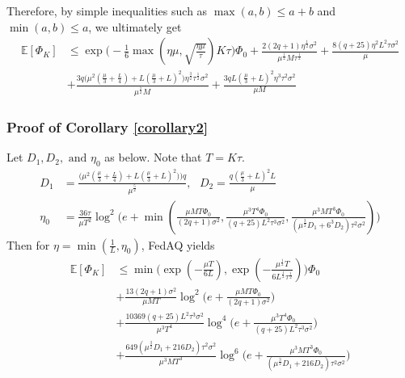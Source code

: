 \documentclass[11pt]{article}
\begin{document}
Therefore, by simple inequalities such as $\max(a, b) \leq a+b$ and $\min(a, b) \leq a$, we ultimately get
\begin{align} \label{ineq_theorem2}
    \mathbb{E}[\Phi_K] &\leq \exp{\Big(-\frac{1}{6}\max(\eta\mu, \sqrt{\frac{\eta\mu}{\tau}})K\tau\Big)} \Phi_0 + \frac{2(2q+1)\eta^{\frac{1}{2}}\sigma^2}{\mu^{\frac{1}{2}}M\tau^{\frac{1}{2}}} + \frac{8(q+25)\eta^2 L^2\tau\sigma^2}{\mu} \nonumber\\
        &+ \frac{3q\Big(\mu^2(\frac{\mu}{3}+\frac{L}{4}) + L(\frac{\mu}{3}+L)^2\Big)\eta^{\frac{3}{2}}\tau^{\frac{1}{2}}\sigma^2}{\mu^{\frac{5}{2}}M} + \frac{3qL(\frac{\mu}{3}+L)^2 \eta^3\tau^2\sigma^2}{\mu M}
\end{align}

\subsubsection{Proof of Corollary \ref{corollary2}}
\label{app:proof_corollary2}

\begin{corollary} \label{corollary2}
    Let $D_1, D_2,\textrm{ and } \eta_0$ as below. Note that $T = K\tau$.
    \begin{align*}
        D_1 &= \frac{\Big( \mu^2(\frac{\mu}{3}+\frac{L}{4}) + L(\frac{\mu}{3}+L)^2) \Big)q}{\mu^{\frac{5}{2}}}, \textrm{ } D_2 = \frac{q(\frac{\mu}{3}+L)^2 L}{\mu} \\
        \eta_0 &= \frac{36\tau}{\mu T^2}\log^2\Big(e+\min(\frac{\mu M T \Phi_0}{(2q+1)\sigma^2}, \frac{\mu^3 T^4\Phi_0}{(q+25)L^2\tau^3\sigma^2}, \frac{\mu^3 M T^3\Phi_0}{(\mu^{\frac{3}{2}}D_1+6^3 D_2)\tau^2\sigma^2}) \Big)
    \end{align*}
    Then for $\eta = \min(\frac{1}{L}, \eta_0)$, FedAQ yields
    \begin{align}
        \mathbb{E}[\Phi_K] &\leq \min \Big( \exp(-\frac{\mu T}{6L}), \exp(-\frac{\mu^{\frac{1}{2}}T}{6 L^{\frac{1}{2}}\tau^{\frac{1}{2}}})\Big) \Phi_0 \nonumber\\
        &+ \frac{13(2q+1)\sigma^2}{\mu MT} \log^2 \Big(e+\frac{\mu M T \Phi_0}{(2q+1)\sigma^2}\Big) \\
        &+ \frac{10369(q+25)L^2\tau^3\sigma^2}{\mu^3 T^4}\log^4 \Big(e+ \frac{\mu^3 T^4\Phi_0}{(q+25)L^2\tau^3\sigma^2}\Big) \\
        &+ \frac{649(\mu^{\frac{3}{2}}D_1+216D_2)\tau^2\sigma^2}{\mu^3 M T^3} \log^6 \Big(e + \frac{\mu^3 M T^3\Phi_0}{(\mu^{\frac{3}{2}}D_1+216 D_2)\tau^2\sigma^2}\Big)
    \end{align}
\end{corollary}
\end{document}
